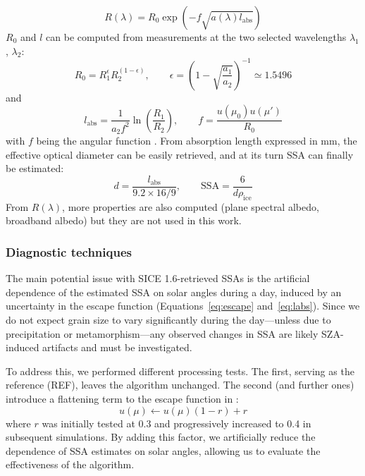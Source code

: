 \documentclass[11pt,a4paper]{article}
\let\oldtexttt\texttt
\renewcommand{\texttt}[1]{\tcbox[boxsep=1pt, left=2pt, right=2pt]{\oldtexttt{#1}}}
\newcommand{\ssa}{\mathrm{SSA}}
\begin{document}
\begin{enumerate}[align=right,itemindent=2em,labelsep=4pt,labelwidth=1em,leftmargin=0pt,nosep]
\begin{equation}
	R(\lambda) = R_0 \exp(-f \sqrt{a(\lambda) l_\mathrm{abs}})
\end{equation}
$R_0$ and $l$ can be computed from measurements at the two selected wavelengths $\lambda_1$, $\lambda_2$:
\begin{equation}
	R_0 = R_1^\epsilon R_2^{(1-\epsilon)}, \qquad \epsilon = \left(1 - \sqrt{\frac{a_1}{a_2}}\right)^{-1} \simeq 1.5496
\end{equation}
and
\begin{equation}\label{eq:labs}
	l_\mathrm{abs} = \frac{1}{a_2 f^2} \ln(\frac{R_1}{R_2}), \qquad f = \frac{u(\mu_0) u(\mu')}{R_0}
\end{equation}
with $f$ being the angular function \parencite{kokhanovskyScatteringOpticsSnow2004}. From absorption length expressed in mm, the effective optical diameter can be easily retrieved, and at its turn SSA can finally be estimated:
\begin{equation}
	d = \frac{l_\mathrm{abs}}{9.2 \times 16 / 9}, \qquad \ssa = \frac{6}{d \rho_\mathrm{ice}}
\end{equation}
From $R(\lambda)$, more properties are also computed (plane spectral albedo, broadband albedo) but they are not used in this work.
\end{enumerate}

	\subsubsection{Diagnostic techniques} \label{sssc:sicediagn}
The main potential issue with SICE 1.6-retrieved SSAs is the artificial dependence of the estimated SSA on solar angles during a day, induced by an uncertainty in the escape function (Equations~\eqref{eq:escape} and~\eqref{eq:labs}). Since we do not expect grain size to vary significantly during the day—unless due to precipitation or metamorphism—any observed changes in SSA are likely SZA-induced artifacts and must be investigated.

To address this, we performed different processing tests. The first, serving as the reference (REF), leaves the algorithm unchanged. The second (and further ones) introduce a flattening term to the escape function in \texttt{sice\_lib.view\_geometry(r)}:
\begin{equation}
	u(\mu) \leftarrow u(\mu) (1 - r) + r
\end{equation}
where $r$ was initially tested at 0.3 and progressively increased to 0.4 in subsequent simulations. By adding this factor, we artificially reduce the dependence of SSA estimates on solar angles, allowing us to evaluate the effectiveness of the algorithm.
\end{document}
